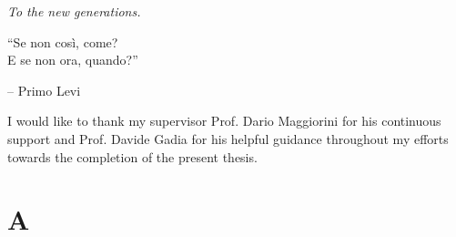 \documentclass[english]{report}
\begin{document}
\renewcommand\contentsname{Index}
\frontespizio
\beforepreface

{
\raggedleft \large \sl To the new generations.\\
	
	\vspace{2cm}
	
	``Se non così, come?\\E se non ora, quando?''
	
	\bigskip
	
	\--- Primo Levi\\
}



I would like to thank my supervisor Prof. Dario Maggiorini for his continuous support and Prof. Davide Gadia for his helpful guidance throughout my efforts towards the completion of the present thesis.

%
%
\afterpreface

















% 
% 

\appendix

\chapter{A}


%
%


\end{document}
